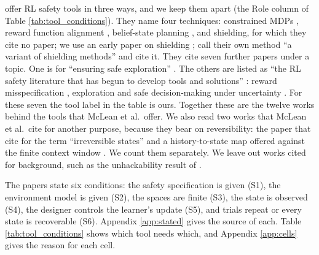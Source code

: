 \documentclass{article}
\begin{document}
\citet{mclean2026} offer RL safety tools in three ways, and we keep them apart (the Role column of Table \ref{tab:tool_conditions}). They name four techniques: constrained MDPs \citep{altman1999, satija2020}, reward function alignment \citep{muslimani2025}, belief-state planning \citep{kaelbling1998}, and shielding, for which they cite no paper; we use an early paper on shielding \citep{alshiekh2018}; \citet{wachi2023} call their own method ``a variant of shielding methods'' and cite it. They cite seven further papers under a topic. One is for ``ensuring safe exploration'' \citep[§1]{wachi2023, mclean2026}. The others are listed as ``the RL safety literature that has begun to develop tools and solutions'' \citep[§3.5]{mclean2026}: reward misspecification \citep{knox2023, vasan2024}, exploration \citep{tse2025, klissarov2023} and safe decision-making under uncertainty \citep{mohammedalamen2025a, mohammedalamen2025b}. For these seven the tool label in the table is ours. Together these are the twelve works behind the tools that McLean et al.~offer. We also read two works that McLean et al.~cite for another purpose, because they bear on reversibility: the paper that \citet{mclean2026} cite for the term ``irreversible states'' \citep{lee2025} and a history-to-state map offered against the finite context window \citep{elelimy2025}. We count them separately. We leave out works cited for background, such as the unhackability result of \citet{skalse2022}.

The papers state six conditions: the safety specification is given (S1), the environment model is given (S2), the spaces are finite (S3), the state is observed (S4), the designer controls the learner's update (S5), and trials repeat or every state is recoverable (S6). Appendix \ref{app:stated} gives the source of each. Table \ref{tab:tool_conditions} shows which tool needs which, and Appendix \ref{app:cells} gives the reason for each cell.
\end{document}
